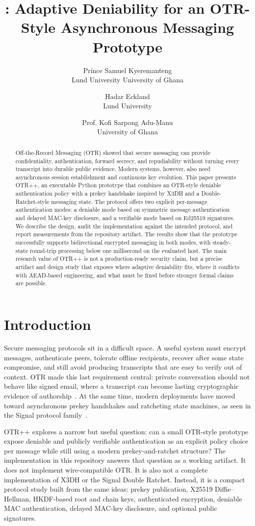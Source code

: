 \documentclass[11pt]{article}
\title{\prot{}: Adaptive Deniability for an OTR-Style Asynchronous Messaging Prototype}
\author{
Prince Samuel Kyeremanteng\\
Lund University \textbar{} University of Ghana
\and
Hadar Eckland\\
Lund University
\and
Prof. Kofi Sarpong Adu-Manu\\
University of Ghana
}
\date{}
\newcommand{\prot}{OTR++}
\begin{document}
\maketitle

\begin{abstract}
Off-the-Record Messaging (OTR) showed that secure messaging can provide confidentiality, authentication, forward secrecy, and repudiability without turning every transcript into durable public evidence. Modern systems, however, also need asynchronous session establishment and continuous key evolution. This paper presents \prot{}, an executable Python prototype that combines an OTR-style deniable authentication policy with a prekey handshake inspired by X3DH and a Double-Ratchet-style messaging state. The protocol offers two explicit per-message authentication modes: a deniable mode based on symmetric message authentication and delayed MAC-key disclosure, and a verifiable mode based on Ed25519 signatures. We describe the design, audit the implementation against the intended protocol, and report measurements from the repository artifact. The results show that the prototype successfully supports bidirectional encrypted messaging in both modes, with steady-state round-trip processing below one millisecond on the evaluated host. The main research value of \prot{} is not a production-ready security claim, but a precise artifact and design study that exposes where adaptive deniability fits, where it conflicts with AEAD-based engineering, and what must be fixed before stronger formal claims are possible.
\end{abstract}

\section{Introduction}

Secure messaging protocols sit in a difficult space. A useful system must encrypt messages, authenticate peers, tolerate offline recipients, recover after some state compromise, and still avoid producing transcripts that are easy to verify out of context. OTR made this last requirement central: private conversation should not behave like signed email, where a transcript can become lasting cryptographic evidence of authorship~\cite{borisov2004otr}. At the same time, modern deployments have moved toward asynchronous prekey handshakes and ratcheting state machines, as seen in the Signal protocol family~\cite{signal_x3dh,signal_doubleratchet}.

\prot{} explores a narrow but useful question: can a small OTR-style prototype expose deniable and publicly verifiable authentication as an explicit policy choice per message while still using a modern prekey-and-ratchet structure? The implementation in this repository answers that question as a working artifact. It does not implement wire-compatible OTR. It is also not a complete implementation of X3DH or the Signal Double Ratchet. Instead, it is a compact protocol study built from the same ideas: prekey publication, X25519 Diffie--Hellman, HKDF-based root and chain keys, authenticated encryption, deniable MAC authentication, delayed MAC-key disclosure, and optional public signatures.
\end{document}
